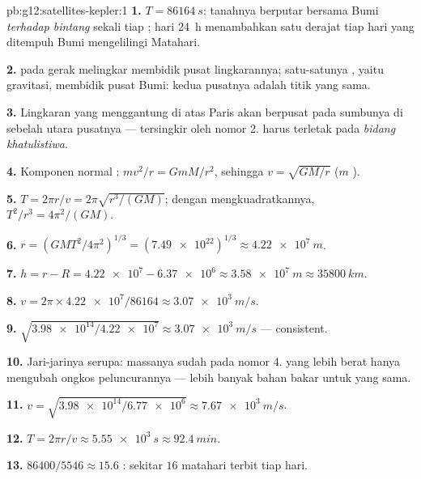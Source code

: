 \begin{solution}{pb:g12:satellites-kepler:1}
\textbf{1.} $T = \qty{86164}{s}$: tanahnya berputar bersama Bumi
\emph{terhadap bintang} sekali tiap ; hari \qty{24}{h}
menambahkan satu derajat tiap hari yang ditempuh Bumi mengelilingi Matahari.

\textbf{2.}  pada gerak melingkar membidik pusat lingkarannya;
satu-satunya , yaitu gravitasi, membidik pusat Bumi: kedua
pusatnya adalah titik yang sama.

\textbf{3.} Lingkaran yang menggantung di atas Paris akan berpusat pada
sumbunya di sebelah utara pusatnya --- tersingkir oleh nomor 2. 
harus terletak pada \emph{bidang khatulistiwa}.

\textbf{4.} Komponen normal :
$m v^2/r = GmM/r^2$, sehingga $v = \sqrt{GM/r}$ ($m$ ).

\textbf{5.} $T = 2\pi r/v = 2\pi\sqrt{r^3/(GM)}$; dengan mengkuadratkannya,
$T^2/r^3 = 4\pi^2/(GM)$.

\textbf{6.} $r = \left(GMT^2/4\pi^2\right)^{1/3} =
(\num{7.49e22})^{1/3} \approx \qty{4.22e7}{m}$.

\textbf{7.} $h = r - R = \num{4.22e7} - \num{6.37e6} \approx
\qty{3.58e7}{m} \approx \qty{35800}{km}$.

\textbf{8.} $v = 2\pi \times \num{4.22e7}/\num{86164} \approx
\qty{3.07e3}{m/s}$.

\textbf{9.} $\sqrt{\num{3.98e14}/\num{4.22e7}} \approx
\qty{3.07e3}{m/s}$ --- consistent.

\textbf{10.} Jari-jarinya serupa: massanya sudah  pada
nomor 4.  yang lebih berat hanya mengubah ongkos peluncurannya ---
lebih banyak bahan bakar untuk  yang sama.

\textbf{11.} $v = \sqrt{\num{3.98e14}/\num{6.77e6}} \approx
\qty{7.67e3}{m/s}$.

\textbf{12.} $T = 2\pi r/v \approx \qty{5.55e3}{s} \approx
\qty{92.4}{min}$.

\textbf{13.} $\num{86400}/5546 \approx 15.6$ : sekitar $16$
matahari terbit tiap hari.


\end{solution}
